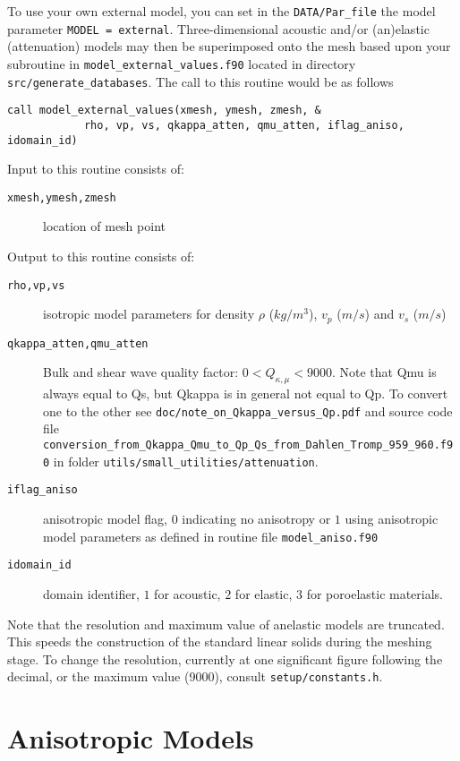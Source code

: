 To use your own external model, you can set in the \texttt{DATA/Par\_file}
the model parameter \texttt{MODEL = external}. Three-dimensional acoustic
and/or (an)elastic (attenuation) models may then be superimposed onto
the mesh based upon your subroutine in \texttt{model\_external\_values.f90}
located in directory \texttt{src/generate\_databases}. The call to
this routine would be as follows
\begin{verbatim}
call model_external_values(xmesh, ymesh, zmesh, &
            rho, vp, vs, qkappa_atten, qmu_atten, iflag_aniso, idomain_id)
\end{verbatim}
Input to this routine consists of:
\begin{description}
\item [{\texttt{xmesh,ymesh,zmesh}}] location of mesh point
\end{description}
Output to this routine consists of:
\begin{description}
\item [{\texttt{rho,vp,vs}}] isotropic model parameters for density $\rho$
($kg/m^{3}$), $v_{p}$ ($m/s$) and $v_{s}$ ($m/s$)
\item [{\texttt{qkappa\_atten,qmu\_atten}}] Bulk and shear wave quality factor: $0<Q_{\kappa,\mu}<9000$.
Note that Qmu is always equal to Qs, but Qkappa is in general not equal to Qp. To convert one to the other see\newline
\texttt{doc/note\_on\_Qkappa\_versus\_Qp.pdf} and source code file\newline
\texttt{conversion\_from\_Qkappa\_Qmu\_to\_Qp\_Qs\_from\_Dahlen\_Tromp\_959\_960.f90}\newline
in folder \texttt{utils/small\_utilities/attenuation}.
\item [{\texttt{iflag\_aniso}}] anisotropic model flag, $0$ indicating
no anisotropy or $1$ using anisotropic model parameters as defined
in routine file \texttt{model\_aniso.f90}
\item [{\texttt{idomain\_id}}] domain identifier, $1$ for acoustic, $2$
for elastic, $3$ for poroelastic materials.
\end{description}
Note that the resolution and maximum value of anelastic models are
truncated. This speeds the construction of the standard linear solids
during the meshing stage. To change the resolution, currently at one
significant figure following the decimal, or the maximum value (9000),
consult \texttt{setup/constants.h}.



\section{Anisotropic Models}\label{sec:Anisotropic-Models}

